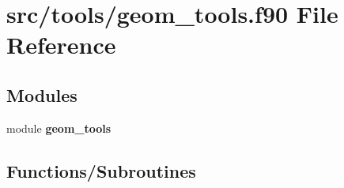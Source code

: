 \section{src/tools/geom\+\_\+tools.f90 File Reference}
\label{geom__tools_8f90}
\subsection*{Modules}
\begin{DoxyCompactItemize}
\item 
module {\bf geom\+\_\+tools}
\end{DoxyCompactItemize}
\subsection*{Functions/\+Subroutines}
